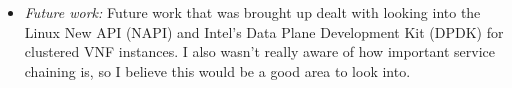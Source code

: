 \documentclass[letterpaper,twocolumn,10pt]{article}
\begin{document}
\begin{itemize}
\item {\it Future work:} 
Future work that was brought up dealt with looking into the Linux New API (NAPI) and Intel's Data Plane 
Development Kit (DPDK) for clustered VNF instances. I also wasn't really aware of how important service
chaining is, so I believe this would be a good area to look into.

\end{itemize}
\end{document}
